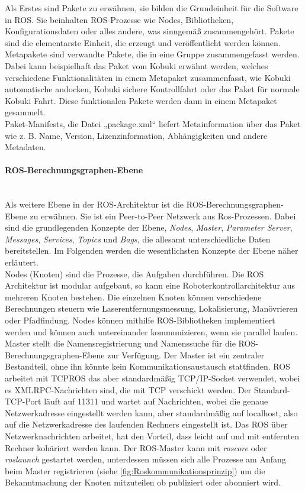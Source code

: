 Als Erstes sind Pakete zu erwähnen, sie bilden die Grundeinheit für die Software in ROS. Sie beinhalten ROS-Prozesse wie Nodes, Bibliotheken, Konfigurationsdaten oder alles andere, was sinngemäß zusammengehört. Pakete sind die elementarste Einheit, die erzeugt und veröffentlicht werden können. \\
Metapakete sind verwandte Pakete, die in eine Gruppe zusammengefasst werden. Dabei kann beispielhaft das Paket vom Kobuki erwähnt werden, welches verschiedene Funktionalitäten in einem Metapaket zusammenfasst, wie Kobuki automatische andocken, Kobuki sichere Kontrollfahrt oder das Paket für normale Kobuki Fahrt. Diese funktionalen Pakete werden dann in einem Metapaket gesammelt. \\
Paket-Manifests, die Datei „package.xml“ liefert Metainformation über das Paket wie z. B. Name, Version, Lizenzinformation, Abhängigkeiten und andere Metadaten. \cite{ROSKonzept.2021, RoboterMitRos.2020} \\

\paragraph{ROS-Berechnungsgraphen-Ebene} \mbox{} \label{hl:ROS_Berechnungs_Ebene}\\
Als weitere Ebene in der ROS-Architektur ist die ROS-Berechnungsgraphen-Ebene zu erwähnen. Sie ist ein Peer-to-Peer Netzwerk aus Ros-Prozessen. Dabei sind die grundlegenden Konzepte der Ebene, \textit{Nodes}, \textit{Master}, \textit{Parameter Server}, \textit{Messages}, \textit{Services}, \textit{Topics} und \textit{Bags}, die allesamt unterschiedliche Daten bereitstellen. Im Folgenden werden die wesentlichsten Konzepte der Ebene näher erläutert. \\

Nodes (Knoten) sind die Prozesse, die Aufgaben durchführen. Die ROS Architektur ist modular aufgebaut, so kann eine Roboterkontrollarchitektur aus mehreren Knoten bestehen. Die einzelnen Knoten können verschiedene Berechnungen steuern wie Laserentfernungsmessung, Lokalisierung, Manövrieren oder Pfadfindung. Nodes können mithilfe ROS-Bibliotheken implementiert werden und können auch untereinander kommunizieren, wenn sie parallel laufen. \\ 
Master stellt die Namensregistrierung und Namenssuche für die ROS-Berechnungsgraphen-Ebene zur Verfügung. Der Master ist ein zentraler Bestandteil, ohne ihn könnte kein Kommunikationsaustausch stattfinden. ROS arbeitet mit TCPROS das aber standardmäßig TCP/IP-Socket verwendet, wobei es XMLRPC-Nachrichten sind, die mit TCP verschickt werden. Der Standard-TCP-Port läuft auf 11311 und wartet auf Nachrichten, wobei die genaue Netzwerkadresse eingestellt werden kann, aber standardmäßig auf localhost, also auf die Netzwerkadresse des laufenden Rechners eingestellt ist. Das ROS über Netzwerknachrichten arbeitet, hat den Vorteil, dass leicht auf und mit entfernten Rechner kohäriert werden kann. Der ROS-Master kann mit \textit{roscore} oder \textit{roslaunch} gestartet werden, unterdessen müssen sich alle Prozesse am Anfang beim Master registrieren (siehe \autoref{fig:Roskommunikationsprinzip}) um die Bekanntmachung der Knoten mitzuteilen ob publiziert oder abonniert wird.

